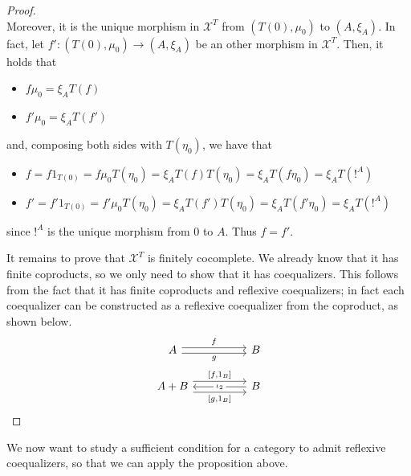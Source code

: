 \begin{subbox}{}
\begin{proof}
\[\]
    Moreover, it is the unique morphism in $\mathcal{X}^T$ from $(T(0),\mu_0)$ to $(A,\xi_A)$. In fact, let $f':(T(0),\mu_0) \to (A,\xi_A)$ be an other morphism in $\mathcal{X}^T$. Then, it holds that
    \begin{itemize}
        \item $f \mu_0 = \xi_A T(f)$
        \item $f' \mu_0 = \xi_A T(f')$
    \end{itemize}
    and, composing both sides with $T(\eta_0)$, we have that
    \begin{itemize}
        \item $f = f 1_{T(0)} = f \mu_0 T(\eta_0) = \xi_A T(f) T(\eta_0) = \xi_A T(f \eta_0) = \xi_A T(!^A)$
        \item $f' = f' 1_{T(0)} = f' \mu_0 T(\eta_0) = \xi_A T(f') T(\eta_0) = \xi_A T(f' \eta_0) = \xi_A T(!^A)$
    \end{itemize}
    since $!^A$ is the unique morphism from $0$ to $A$. Thus $f=f'$.

    It remains to prove that $\mathcal{X}^T$ is finitely cocomplete. We already know that it has finite coproducts, so we only need to show that it has coequalizers. This follows from the fact that it has finite coproducts and reflexive coequalizers; in fact each coequalizer can be constructed as a reflexive coequalizer from the coproduct, as shown below.
        \[
\begin{tikzcd}
A \arrow[rr, "f", shift left] \arrow[rr, "g"', shift right]                       &  & B                                   \\
A+B \arrow[rr, "{[f,1_B]}", shift left=2] \arrow[rr, "{[g,1_B]}"', shift right=2] &  & B \arrow[ll, "\iota_2" description]
\end{tikzcd}
        \]
    \end{proof}  
\end{subbox}

We now want to study a sufficient condition for a category to admit reflexive coequalizers, so that we can apply the proposition above.

